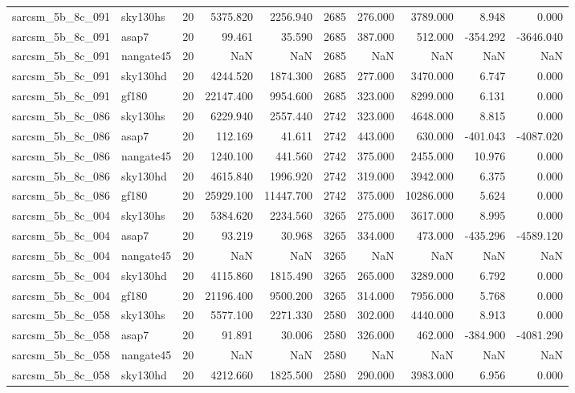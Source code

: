\begin{longtable}{llrrrrrrrr}
sarcsm\_5b\_8c\_091 & sky130hs & 20 & 5375.820 & 2256.940 & 2685 & 276.000 & 3789.000 & 8.948 & 0.000 \\
sarcsm\_5b\_8c\_091 & asap7 & 20 & 99.461 & 35.590 & 2685 & 387.000 & 512.000 & -354.292 & -3646.040 \\
sarcsm\_5b\_8c\_091 & nangate45 & 20 & NaN & NaN & 2685 & NaN & NaN & NaN & NaN \\
sarcsm\_5b\_8c\_091 & sky130hd & 20 & 4244.520 & 1874.300 & 2685 & 277.000 & 3470.000 & 6.747 & 0.000 \\
sarcsm\_5b\_8c\_091 & gf180 & 20 & 22147.400 & 9954.600 & 2685 & 323.000 & 8299.000 & 6.131 & 0.000 \\
sarcsm\_5b\_8c\_086 & sky130hs & 20 & 6229.940 & 2557.440 & 2742 & 323.000 & 4648.000 & 8.815 & 0.000 \\
sarcsm\_5b\_8c\_086 & asap7 & 20 & 112.169 & 41.611 & 2742 & 443.000 & 630.000 & -401.043 & -4087.020 \\
sarcsm\_5b\_8c\_086 & nangate45 & 20 & 1240.100 & 441.560 & 2742 & 375.000 & 2455.000 & 10.976 & 0.000 \\
sarcsm\_5b\_8c\_086 & sky130hd & 20 & 4615.840 & 1996.920 & 2742 & 319.000 & 3942.000 & 6.375 & 0.000 \\
sarcsm\_5b\_8c\_086 & gf180 & 20 & 25929.100 & 11447.700 & 2742 & 375.000 & 10286.000 & 5.624 & 0.000 \\
sarcsm\_5b\_8c\_004 & sky130hs & 20 & 5384.620 & 2234.560 & 3265 & 275.000 & 3617.000 & 8.995 & 0.000 \\
sarcsm\_5b\_8c\_004 & asap7 & 20 & 93.219 & 30.968 & 3265 & 334.000 & 473.000 & -435.296 & -4589.120 \\
sarcsm\_5b\_8c\_004 & nangate45 & 20 & NaN & NaN & 3265 & NaN & NaN & NaN & NaN \\
sarcsm\_5b\_8c\_004 & sky130hd & 20 & 4115.860 & 1815.490 & 3265 & 265.000 & 3289.000 & 6.792 & 0.000 \\
sarcsm\_5b\_8c\_004 & gf180 & 20 & 21196.400 & 9500.200 & 3265 & 314.000 & 7956.000 & 5.768 & 0.000 \\
sarcsm\_5b\_8c\_058 & sky130hs & 20 & 5577.100 & 2271.330 & 2580 & 302.000 & 4440.000 & 8.913 & 0.000 \\
sarcsm\_5b\_8c\_058 & asap7 & 20 & 91.891 & 30.006 & 2580 & 326.000 & 462.000 & -384.900 & -4081.290 \\
sarcsm\_5b\_8c\_058 & nangate45 & 20 & NaN & NaN & 2580 & NaN & NaN & NaN & NaN \\
sarcsm\_5b\_8c\_058 & sky130hd & 20 & 4212.660 & 1825.500 & 2580 & 290.000 & 3983.000 & 6.956 & 0.000 \\

\end{longtable}
